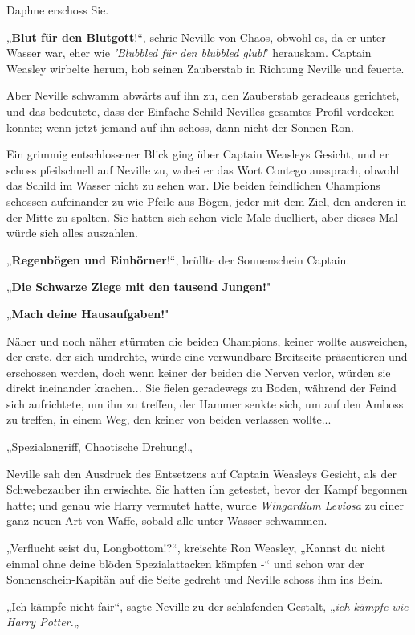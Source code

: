 {Daphne erschoss Sie.

„\textbf{Blut für den Blutgott}!“, schrie Neville von Chaos, obwohl es, da er unter Wasser war, eher wie \emph{'Blubbled für den blubbled glub!}' herauskam. Captain Weasley wirbelte herum, hob seinen Zauberstab in Richtung Neville und feuerte.

Aber Neville schwamm abwärts auf ihn zu, den Zauberstab geradeaus gerichtet, und das bedeutete, dass der Einfache Schild Nevilles gesamtes Profil verdecken konnte; wenn jetzt jemand auf ihn schoss, dann nicht der Sonnen-Ron.

Ein grimmig entschlossener Blick ging über Captain Weasleys Gesicht, und er schoss pfeilschnell auf Neville zu, wobei er das Wort Contego aussprach, obwohl das Schild im Wasser nicht zu sehen war. Die beiden feindlichen Champions schossen aufeinander zu wie Pfeile aus Bögen, jeder mit dem Ziel, den anderen in der Mitte zu spalten. Sie hatten sich schon viele Male duelliert, aber dieses Mal würde sich alles auszahlen.

„\textbf{Regenbögen und Einhörner}!“, brüllte der Sonnenschein Captain.

„\textbf{Die Schwarze Ziege mit den tausend Jungen!}"

„\textbf{Mach deine Hausaufgaben!}"

Näher und noch näher stürmten die beiden Champions, keiner wollte ausweichen, der erste, der sich umdrehte, würde eine verwundbare Breitseite präsentieren und erschossen werden, doch wenn keiner der beiden die Nerven verlor, würden sie direkt ineinander krachen... Sie fielen geradewegs zu Boden, während der Feind sich aufrichtete, um ihn zu treffen, der Hammer senkte sich, um auf den Amboss zu treffen, in einem Weg, den keiner von beiden verlassen wollte...

„Spezialangriff, Chaotische Drehung!„

Neville sah den Ausdruck des Entsetzens auf Captain Weasleys Gesicht, als der Schwebezauber ihn erwischte. Sie hatten ihn getestet, bevor der Kampf begonnen hatte; und genau wie Harry vermutet hatte, wurde \emph{Wingardium Leviosa} zu einer ganz neuen Art von Waffe, sobald alle unter Wasser schwammen.

„Verflucht seist du, Longbottom!?“, kreischte Ron Weasley, „Kannst du nicht einmal ohne deine blöden Spezialattacken kämpfen -“ und schon war der Sonnenschein-Kapitän auf die Seite gedreht und Neville schoss ihm ins Bein.

„Ich kämpfe nicht fair“, sagte Neville zu der schlafenden Gestalt, „\emph{ich kämpfe wie Harry Potter.}„

}
